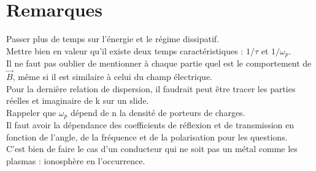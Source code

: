\documentclass[12pt,prb,aps,epsf]{article}
\begin{document}
\section*{Remarques}
Passer plus de temps sur l'énergie et le régime dissipatif.\\
Mettre bien en valeur qu'il existe deux temps caractéristiques : $1/\tau$ et $1/\omega_p$.\\
Il ne faut pas oublier de mentionner à chaque partie quel est le comportement de $\vec{B}$, même si il est similaire à celui du champ électrique.\\
Pour la dernière relation de dispersion, il faudrait peut être tracer les parties réelles et imaginaire de k sur un slide.\\
Rappeler que $\omega_p$ dépend de n la densité de porteurs de charges.\\
Il faut avoir la dépendance des coefficients de réflexion et de transmission en fonction de l'angle, de la fréquence et de la polarisation pour les questions.\\
C'est bien de faire le cas d'un conducteur qui ne soit pas un métal comme les plasmas : ionosphère en l'occurrence.
\end{document}
